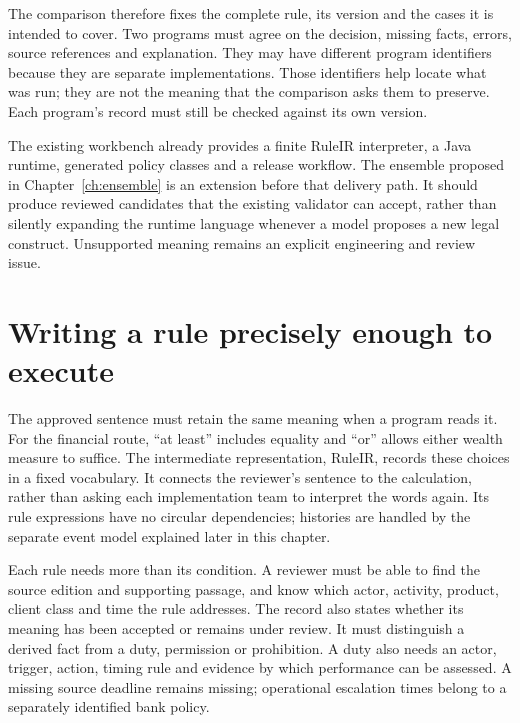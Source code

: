 \documentclass[12pt,a4paper,oneside,openany]{book}
\begin{document}
The comparison therefore fixes the complete rule, its version and the cases it
is intended to cover. Two programs must agree on the decision, missing facts,
errors, source references and explanation. They may have different program
identifiers because they are separate implementations. Those identifiers help
locate what was run; they are not the meaning that the comparison asks them to
preserve. Each program's record must still be checked against its own version.

The existing workbench already provides a finite RuleIR interpreter, a Java
runtime, generated policy classes and a release workflow. The ensemble proposed
in Chapter~\ref{ch:ensemble} is an extension before that delivery path. It should
produce reviewed candidates that the existing validator can accept, rather than
silently expanding the runtime language whenever a model proposes a new legal
construct. Unsupported meaning remains an explicit engineering and review issue.

\section{Writing a rule precisely enough to execute}
\label{merge:P-03-product:02}


The approved sentence must retain the same meaning when a program reads it.
For the financial route, ``at least'' includes equality and ``or'' allows either
wealth measure to suffice. The intermediate representation, RuleIR, records these
choices in a fixed vocabulary. It connects the reviewer's sentence to the
calculation, rather than asking each implementation team to interpret the words
again. Its rule expressions have no circular dependencies; histories are handled
by the separate event model explained later in this chapter.

Each rule needs more than its condition. A reviewer must be able to find the
source edition and supporting passage, and know which actor, activity, product,
client class and time the rule addresses. The record also states whether its
meaning has been accepted or remains under review. It must distinguish a derived fact from
a duty, permission or prohibition. A duty also needs an actor, trigger, action,
timing rule and evidence by which performance can be assessed. A missing source
deadline remains missing; operational escalation times belong to a separately
identified bank policy.
\end{document}

